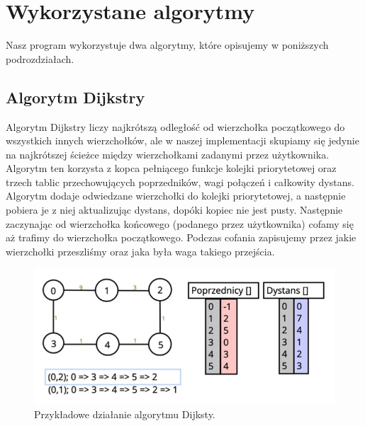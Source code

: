 \documentclass[10pt, a4paper]{report}
\begin{document}
\section{Wykorzystane algorytmy}\label{sec:wykorzystane-algorytmy}
Nasz program wykorzystuje dwa algorytmy, które opisujemy w poniższych
podrozdziałach.

\subsection{Algorytm Dijkstry}\label{subsec:algorytm-dijkstry}
Algorytm Dijkstry liczy najkrótszą odległość od wierzchołka początkowego do
wszystkich innych wierzchołków,
ale w naszej implementacji skupiamy się jedynie na najkrótszej ścieżce między
wierzchołkami zadanymi przez
użytkownika. Algorytm ten korzysta z kopca pełniącego funkcje kolejki
priorytetowej oraz trzech tablic przechowujących
poprzedników, wagi połączeń i całkowity dystans.
Algorytm dodaje odwiedzane wierzchołki do kolejki priorytetowej, a następnie
pobiera je z niej aktualizując dystans,
dopóki kopiec nie jest pusty. Następnie zaczynając od wierzchołka końcowego
(podanego przez użytkownika) cofamy się aż trafimy do wierzchołka początkowego.
Podczas cofania zapisujemy przez jakie wierzchołki przeszliśmy oraz jaka była
waga takiego przejścia.
\begin{figure}[h]
  \begin{center}
    \includegraphics[scale=0.5]{dijkstra.png}
    \caption{Przykładowe działanie algorytmu Dijksty.}
  \end{center}
\end{figure}
\newpage
\end{document}
